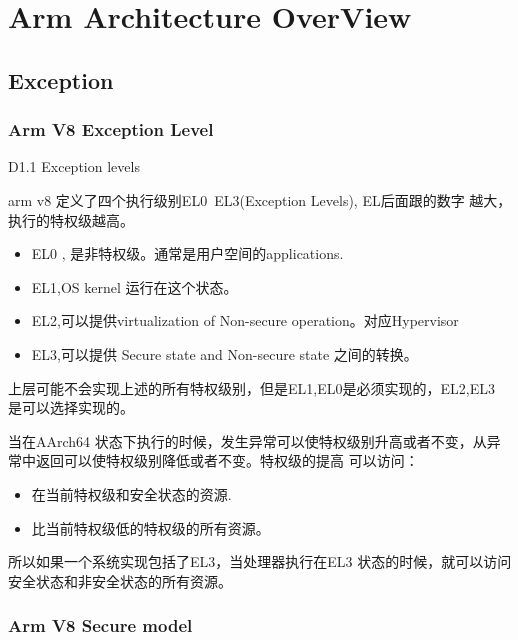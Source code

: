 \chapter{Arm Architecture OverView}



\section{Exception}

\subsection{Arm V8 Exception Level}


D1.1 Exception levels

arm v8 定义了四个执行级别EL0~EL3(Exception Levels),
EL后面跟的数字 越大，执行的特权级越高。
\begin{itemize}
\item EL0 , 是非特权级。通常是用户空间的applications.

\item EL1,OS kernel 运行在这个状态。

\item EL2,可以提供virtualization of Non-secure operation。对应Hypervisor

\item EL3,可以提供 Secure state and Non-secure state 之间的转换。
\end{itemize}

上层可能不会实现上述的所有特权级别，但是EL1,EL0是必须实现的，EL2,EL3 是可以选择实现的。

当在AArch64 状态下执行的时候，发生异常可以使特权级别升高或者不变，从异常中返回可以使特权级别降低或者不变。特权级的提高
可以访问：
\begin{itemize}

\item 在当前特权级和安全状态的资源.

\item 比当前特权级低的特权级的所有资源。

\end{itemize}


所以如果一个系统实现包括了EL3，当处理器执行在EL3 状态的时候，就可以访问安全状态和非安全状态的所有资源。


\subsection {Arm V8 Secure model}


